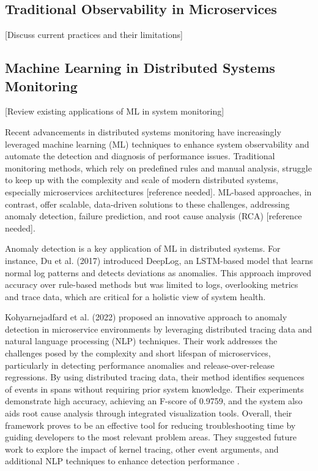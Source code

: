 \documentclass[10pt,journal,compsoc]{IEEEtran}
\begin{document}
\subsection{Traditional Observability in Microservices}
[Discuss current practices and their limitations]

\subsection{Machine Learning in Distributed Systems Monitoring}
[Review existing applications of ML in system monitoring]

Recent advancements in distributed systems monitoring have increasingly leveraged machine learning (ML) techniques to enhance system observability and automate the detection and diagnosis of performance issues. Traditional monitoring methods, which rely on predefined rules and manual analysis, struggle to keep up with the complexity and scale of modern distributed systems, especially microservices architectures [reference needed]. ML-based approaches, in contrast, offer scalable, data-driven solutions to these challenges, addressing anomaly detection, failure prediction, and root cause analysis (RCA) [reference needed].

Anomaly detection is a key application of ML in distributed systems. For instance, Du et al. (2017) \cite{du2017deeplog} introduced DeepLog, an LSTM-based model that learns normal log patterns and detects deviations as anomalies. This approach improved accuracy over rule-based methods but was limited to logs, overlooking metrics and trace data, which are critical for a holistic view of system health.

Kohyarnejadfard et al. (2022) proposed an innovative approach to anomaly detection in microservice environments by leveraging distributed tracing data and natural language processing (NLP) techniques. Their work addresses the challenges posed by the complexity and short lifespan of microservices, particularly in detecting performance anomalies and release-over-release regressions. By using distributed tracing data, their method identifies sequences of events in spans without requiring prior system knowledge. Their experiments demonstrate high accuracy, achieving an F-score of 0.9759, and the system also aids root cause analysis through integrated visualization tools. Overall, their framework proves to be an effective tool for reducing troubleshooting time by guiding developers to the most relevant problem areas. They suggested future work to explore the impact of kernel tracing, other event arguments, and additional NLP techniques to enhance detection performance \cite{kohyarnejadfard2022anomaly}.
\end{document}
